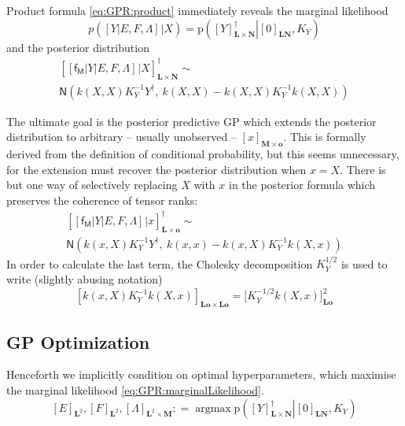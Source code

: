 \documentclass[preprint,12pt]{elsarticle}
\newcommand*{\M}[1]{\ensuremath{#1}\xspace}
\newcommand*{\x}{\times}
\newcommand*{\mi}[1]{\mathbf{#1}}
\newcommand*{\rv}[1]{\mathsf{#1}}
\newcommand*{\te}[2][]{\left\lbrack{#2}\right\rbrack_{#1}}
\newcommand*{\tte}[2][]{\lbrack{#2}\rbrack_{#1}}
\newcommand*{\prob}[3]{\M{\mathrm{p}\!\left(\left.{#1}\right\vert{#2,#3}\right)}}
\newcommand*{\deq}{\M{\mathrel{\mathop:}=}}
\newcommand*{\gauss}[2]{\mathsf{N}\!\left({#1,#2}\right)}
\DeclareMathOperator*{\argmax}{argmax}
\begin{document}
        Product formula \cref{eq:GPR:product} immediately reveals the marginal likelihood
        \begin{equation} \label{eq:GPR:marginalLikelihood}
            p\!\left(\te{Y \vert E,F,\Lambda} \big\vert X\right)
            = \prob{\te[\mi{L\x N}]{Y}^{\dagger}}{\te[\mi{LN}]{0}}{K_Y}
        \end{equation}
        and the posterior distribution
        \begin{multline*}
            \te[\mi{L\x N}]{\te{\rv{f_M} \vert Y \vert E,F,\Lambda} \big\vert X}^{\dagger} \sim \\
            \gauss{k(X,X) K_{Y}^{-1} Y^{\dagger}}{\ k(X,X) - k(X,X) K_{Y}^{-1} k(X,X)}
        \end{multline*}

        The ultimate goal is the posterior predictive GP which extends the posterior distribution to arbitrary -- usually unobserved -- $\te[\mi{M}\x\mi{o}]{x}$. This is formally derived from the definition of conditional probability, but this seems unnecessary, for the extension must recover the posterior distribution when $x=X$. There is but one way of selectively replacing $X$ with $x$ in the posterior formula which preserves the coherence of tensor ranks:
        \begin{multline} \label{def:GPR:Predictive}
            \te[\mi{L\x o}]{\te{\rv{f_M} \vert Y \vert E,F,\Lambda} \big\vert x}^{\dagger} \sim \\
            \gauss{k(x,X) K_{Y}^{-1} Y^{\dagger}}{\ k(x,x) - k(x,X) K_{Y}^{-1} k(X,x)}
        \end{multline}
        In order to calculate the last term, the Cholesky decomposition $K_{Y}^{1/2}$ is used to write (slightly abusing notation)
        \begin{equation*}
            \te[\mi{Lo\x Lo}]{k(x,X) K_{Y}^{-1} k(X,x)} = \tte[\mi{Lo}]{K_{Y}^{-1/2} k(X,x)}^{2}
        \end{equation*}

    \subsection{GP Optimization} \label{sub:GPR:Optimization}
        Henceforth we implicitly condition on optimal hyperparameters, which maximise the marginal likelihood \cref{eq:GPR:marginalLikelihood}.
        \begin{equation} \label{eq:GPR:hyperparameters}
            \te[\mi{L}^{2}]{E},\te[\mi{L}^{2}]{F},\te[\mi{L}^{2}\x\mi{M}]{\Lambda} \deq \argmax \prob{\te[\mi{L\x N}]{Y}^{\dagger}}{\te[\mi{LN}]{0}}{K_Y}
        \end{equation}
\end{document}
